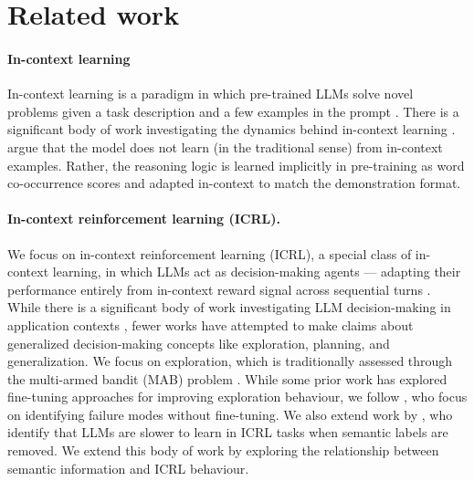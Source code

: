\documentclass{article} %
\begin{document}
\section{Related work}
\paragraph{In-context learning}
In-context learning is a paradigm in which pre-trained LLMs solve novel problems given a task description and a few examples in the prompt \citep{brown2020language, dong-etal-2024-survey}. There is a significant body of work investigating the dynamics behind in-context learning \citep{Shi2023LargeLM}. \citet{min2022rethinkingroledemonstrationsmakes} argue that the model does not learn (in the traditional sense) from in-context examples. Rather, the reasoning logic is learned implicitly in pre-training \citep{chu2025sft} as word co-occurrence scores and adapted in-context to match the demonstration format.

\paragraph{In-context reinforcement learning (ICRL).}
We focus on in-context reinforcement learning (ICRL), a special class of in-context learning, in which LLMs act as decision-making agents --- adapting their performance entirely from in-context reward signal across sequential turns \citep{krishna_icl, monea_bandit, nie2025evolveevaluatingoptimizingllms}. While there is a significant body of work investigating LLM decision-making in application contexts \citep{reflexion, zhouWebArenaRealisticWeb2023, wangVoyagerOpenEndedEmbodied2023a}, fewer works have attempted to make claims about generalized decision-making concepts like exploration, planning, and generalization. We focus on exploration, which is traditionally assessed through the multi-armed bandit (MAB) problem \citep{suttonReinforcementLearningIntroduction2020}. While some prior work has explored fine-tuning approaches \citep{nie2025evolveevaluatingoptimizingllms, icrl_algodist, iclr_supervised} for improving exploration behaviour, we follow \citet{krishna_icl}, who focus on identifying failure modes without fine-tuning. We also extend work by \citet{monea_bandit}, who identify that LLMs are slower to learn in ICRL tasks when semantic labels are removed. We extend this body of work by exploring the relationship between semantic information and ICRL behaviour.
\end{document}
